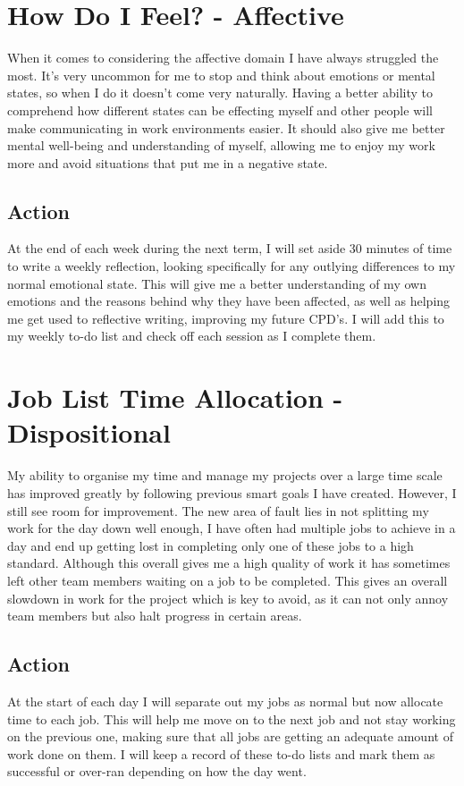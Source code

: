 \documentclass{scrartcl}
\begin{document}
\section{How Do I Feel? - Affective}
When it comes to considering the affective domain I have always struggled the most. It's very uncommon for me to stop and think about emotions or mental states, so when I do it doesn't come very naturally. Having a better ability to comprehend how different states can be effecting myself and other people will make communicating in work environments easier. It should also give me better mental well-being and understanding of myself, allowing me to enjoy my work more and avoid situations that put me in a negative state.
\subsection{Action}
At the end of each week during the next term, I will set aside 30 minutes of time to write a weekly reflection, looking specifically for any outlying differences to my normal emotional state. This will give me a better understanding of my own emotions and the reasons behind why they have been affected, as well as helping me get used to reflective writing, improving my future CPD's. I will add this to my weekly to-do list and check off each session as I complete them.

\section{Job List Time Allocation - Dispositional}
My ability to organise my time and manage my projects over a large time scale has improved greatly by following previous smart goals I have created. However, I still see room for improvement. The new area of fault lies in not splitting my work for the day down well enough, I have often had multiple jobs to achieve in a day and end up getting lost in completing only one of these jobs to a high standard. Although this overall gives me a high quality of work it has sometimes left other team members waiting on a job to be completed. This gives an overall slowdown in work for the project which is key to avoid, as it can not only annoy team members but also halt progress in certain areas.
\subsection{Action}
At the start of each day I will separate out my jobs as normal but now allocate time to each job. This will help me move on to the next job and not stay working on the previous one, making sure that all jobs are getting an adequate amount of work done on them. I will keep a record of these to-do lists and mark them as successful or over-ran depending on how the day went.
\end{document}
